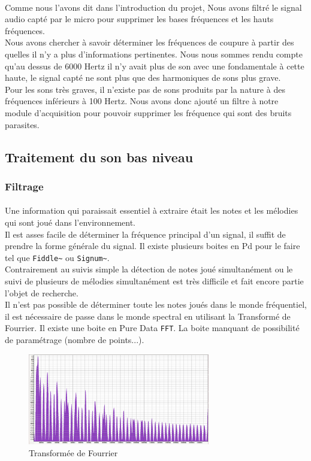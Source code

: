 \documentclass[a4paper, titlepage, oneside, 12pt]{article}%
\begin{document}
\paragraph{}
Comme nous l'avons dit dans l'introduction du projet, Nous avons filtré le signal audio capté par le micro pour supprimer les bases fréquences et les hauts fréquences.\\
Nous avons chercher à savoir déterminer les fréquences de coupure à partir des quelles il n'y a plus d'informations pertinentes. Nous nous sommes rendu compte qu'au dessus de 6000 Hertz il n'y avait plus de son avec une fondamentale à cette haute, le signal capté ne sont plus que des harmoniques de sons plus grave.\\ %
Pour les sons très graves, il n'existe pas de sons produits par la nature à des fréquences inférieurs à 100 Hertz. Nous avons donc ajouté un filtre à notre module d'acquisition pour pouvoir supprimer les fréquence qui sont des bruits parasites.

\subsection{Traitement du son bas niveau}
\subsubsection{Filtrage}
\paragraph{}
Une information qui paraissait essentiel à extraire était les notes et les mélodies qui sont joué dans l’environnement.\\
Il est asses facile de déterminer la fréquence principal d'un signal, il suffit de prendre la forme générale du signal. Il existe plusieurs boites en Pd pour le faire tel que \texttt{Fiddle\~} ou \texttt{Signum\~}.\\
Contrairement au suivis simple la détection de notes joué simultanément ou le suivi de  plusieurs de mélodies simultanément est très difficile et fait encore partie l'objet de recherche.\\
Il n'est pas possible de déterminer toute les notes joués dans le monde fréquentiel, il est nécessaire de passe dans le monde spectral en utilisant la Transformé de Fourrier. Il existe une boite en Pure Data \texttt{FFT}. La boite manquant de possibilité de paramétrage (nombre de points...).
\begin{figure}[H]
	\centering
	\includegraphics[width=300px]{fft.jpg}
	\caption{Transformée de Fourrier}
\end{figure}
\end{document}
